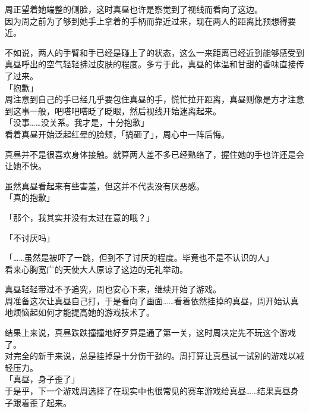 周正望着她端整的侧脸，这时真昼也许是察觉到了视线而看向了这边。\\

因为周之前为了够到她手上拿着的手柄而靠近过来，现在两人的距离比预想得要近。

不如说，两人的手臂和手已经是碰上了的状态，这么一来距离已经近到能够感受到真昼呼出的空气轻轻拂过皮肤的程度。多亏于此，真昼的体温和甘甜的香味直接传了过来。\\

「抱歉」\\

周注意到自己的手已经几乎要包住真昼的手，慌忙拉开距离，真昼则像是方才注意到这事一般，吧嗒吧嗒眨了眨眼，然后视线开始迷离起来。\\

「没事……没关系。我才是，十分抱歉」\\

看着真昼开始泛起红晕的脸颊，「搞砸了」，周心中一阵后悔。

真昼并不是很喜欢身体接触。就算两人差不多已经熟络了，握住她的手也许还是会让她不快。

虽然真昼看起来有些害羞，但这并不代表没有厌恶感。\\

「真的抱歉」

「那个，我其实并没有太过在意的哦？」

「不讨厌吗」

「……虽然是被吓了一跳，但到不了讨厌的程度。毕竟也不是不认识的人」\\

看来心胸宽广的天使大人原谅了这边的无礼举动。

真昼轻轻带过不予追究，周也安心下来，继续开始了游戏。\\

周准备这次让真昼自己打，于是看向了画面……看着依然挂掉的真昼，周开始认真地烦恼起如何才能提高她的游戏技术了。\\

\vspace{2\baselineskip}

结果上来说，真昼跌跌撞撞地好歹算是通了第一关，这时周决定先不玩这个游戏了。\\

对完全的新手来说，总是挂掉是十分伤干劲的。周打算让真昼试一试别的游戏以减轻压力。\\

「真昼，身子歪了」\\

于是乎，下一个游戏周选择了在现实中也很常见的赛车游戏给真昼……结果真昼身子跟着歪了起来。

